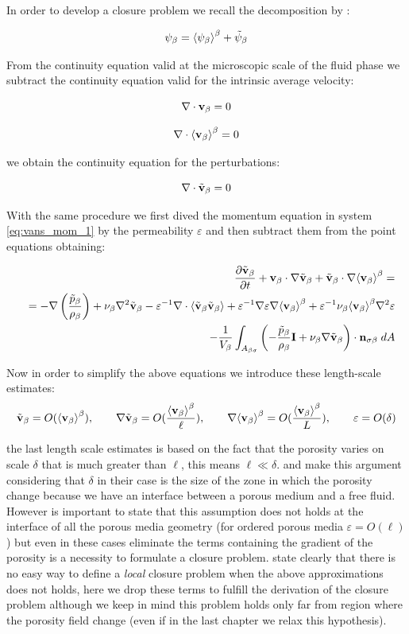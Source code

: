 In order to develop a closure problem we recall the decomposition by \citet{gray1975derivation}:

\begin{equation}
\psi_{\beta} = {\left< \psi_{\beta} \right>}^{\beta} + \tilde{\psi}_{\beta}
\end{equation}

From the continuity equation valid at the microscopic scale of the fluid phase we subtract the continuity equation valid for the intrinsic average velocity:

$$
\nabla \cdot  \textbf{v}_{\beta}  = 0
$$

$$
\nabla \cdot  {\left< \textbf{v}_{\beta}\right>}^{\beta}  = 0 
$$

we obtain the continuity equation for the perturbations:

\begin{equation}
\nabla \cdot \tilde{\textbf{v}}_{\beta} = 0 
\end{equation}


With the same procedure we first dived the momentum equation in system \ref{eq:vans_mom_1} by the permeability $\varepsilon$ and then subtract them from the point equations obtaining:

\begin{eqnarray}
&&  \dfrac{\partial \tilde{\textbf{v}}_{\beta}}{\partial t} + \textbf{v}_{\beta} \cdot \nabla \tilde{\textbf{v}}_{\beta} + \tilde{\textbf{v}}_{\beta} \cdot \nabla {\left< \textbf{v}_{\beta}\right>}^{\beta}  = \nonumber \\
&&= -\nabla \left(\dfrac{\tilde{p}_{\beta}}{\rho_{\beta}}\right) + \nu_{\beta} \nabla^2 \tilde{\textbf{v}}_{\beta} - \varepsilon^{-1}\nabla \cdot  {\left< \tilde{\textbf{v}}_{\beta}\tilde{\textbf{v}}_{\beta}\right>} +  \varepsilon^{-1} \nabla \varepsilon \nabla {\left< \textbf{v}_{\beta}\right>}^{\beta} + \varepsilon^{-1} \nu_{\beta} {\left< \textbf{v}_{\beta} \right>}^{\beta} \nabla^2 \varepsilon \nonumber \\
&&- \dfrac{1}{V_\beta} \displaystyle\int_{A_{\beta \sigma}} \left(-\dfrac{\tilde{p}_{\beta}}{\rho_{\beta}} \mathbf{I}  + \nu_{\beta} \nabla \tilde{\textbf{v}}_{\beta} \right) \cdot \mathbf{n}_{\sigma \beta} \;dA
\label{eq:vans_mom_3}
\end{eqnarray}

Now in order to simplify the above equations we introduce these length-scale estimates:
$$ \tilde{\textbf{v}}_{\beta} = O({\left< \textbf{v}_{\beta} \right>}^{\beta}), \qquad \nabla\tilde{\textbf{v}}_{\beta} = O(\dfrac{{\left< \textbf{v}_{\beta} \right>}^{\beta}}{\ell}), \qquad  \nabla {\left< \textbf{v}_{\beta}\right>}^{\beta} = O(\dfrac{{\left< \textbf{v}_{\beta} \right>}^{\beta}}{L}), \qquad \varepsilon = O(\delta) $$

the last length scale estimates is based on the fact that the porosity varies on scale $\delta$ that is much greater than $\ell$, this means $\ell \ll \delta$. \citet{valdes2013velocity} and \citet{ochoa1995momentum} make this argument considering that $\delta$ in their case is the size of the zone in which the porosity change because we have an interface between a porous medium and a free fluid.
However is important to state that this assumption does not holds at the interface of all the porous media geometry (for ordered porous media $\varepsilon = O(\ell)$) but even in these cases eliminate the terms containing the gradient of the porosity is a necessity to formulate a closure problem.
\citet{whitaker1996forchheimer} state clearly that there is no easy way to define a \textit{local} closure problem when the above approximations does not holds, here we drop these terms to fulfill the derivation of the closure problem although we keep in mind this problem holds only far from region where the porosity field change (even if in the last chapter we relax this hypothesis).

